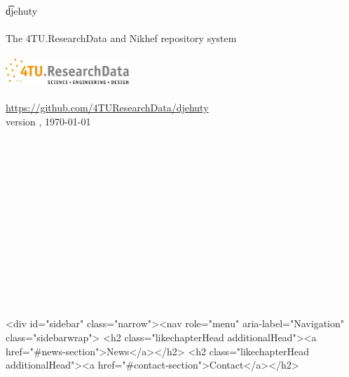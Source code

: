 \documentclass[12pt,a4paper]{book}
\begin{document}
{{{{{{\else
\begin{titlepage}
  \begin{center}
    \vspace*{\fill}
    { \Huge \t{djehuty} }~\\~\\
    { \Large The 4TU.ResearchData and Nikhef repository system }~\\~\\
    \includegraphics[width=0.35\textwidth]{figures/logo.pdf}
    ~\\~\\
    \url{https://github.com/4TUResearchData/djehuty}~\\
    version \djehutyversion{}, \today{}
    ~\\~\\~\\~\\~\\~\\~\\~\\~\\~\\~\\~\\~\\~\\
    \vspace*{\fill}
  \end{center}
  \thispagestyle{empty}
\end{titlepage}
\fi

\setcounter{page}{1}
\hypersetup{linkcolor=black}

\ifdefined\HCode
\begin{html}
<div id="sidebar" class="narrow"><nav role="menu" aria-label="Navigation" class="sidebarwrap">
<h2 class="likechapterHead additionalHead"><a href="#news-section">News</a></h2>
<h2 class="likechapterHead additionalHead"><a href="#contact-section">Contact</a></h2>
\end{html}
\renewcommand{\contentsname}{\href{\#titlepage}{Documentation}}
\fi

\tableofcontents

\ifdefined\HCode
\else
\listoffigures
\fi

\newpage{}
\hypersetup{linkcolor=LinkGray}
\setcounter{page}{1}

}}}}}}
\end{document}
